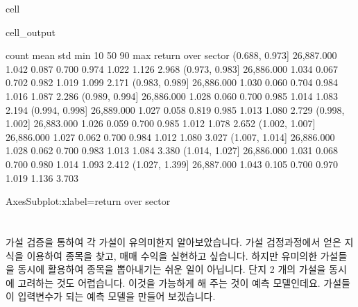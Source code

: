 \documentclass[letterpaper,10pt,english]{jupyterBook}
\begin{document}
\begin{sphinxuseclass}{cell}
\begin{sphinxVerbatimOutput}
\begin{sphinxuseclass}{cell_output}
\begin{sphinxVerbatim}[commandchars=\\\{\}]
                        count  mean   std   min   10\PYGZpc{}   50\PYGZpc{}   90\PYGZpc{}   max
return over sector                                                     
(0.688, 0.973]     26,887.000 1.042 0.087 0.700 0.974 1.022 1.126 2.968
(0.973, 0.983]     26,886.000 1.034 0.067 0.702 0.982 1.019 1.099 2.171
(0.983, 0.989]     26,886.000 1.030 0.060 0.704 0.984 1.016 1.087 2.286
(0.989, 0.994]     26,886.000 1.028 0.060 0.700 0.985 1.014 1.083 2.194
(0.994, 0.998]     26,889.000 1.027 0.058 0.819 0.985 1.013 1.080 2.729
(0.998, 1.002]     26,883.000 1.026 0.059 0.700 0.985 1.012 1.078 2.652
(1.002, 1.007]     26,886.000 1.027 0.062 0.700 0.984 1.012 1.080 3.027
(1.007, 1.014]     26,886.000 1.028 0.062 0.700 0.983 1.013 1.084 3.380
(1.014, 1.027]     26,886.000 1.031 0.068 0.700 0.980 1.014 1.093 2.412
(1.027, 1.399]     26,887.000 1.043 0.105 0.700 0.970 1.019 1.136 3.703
\end{sphinxVerbatim}

\begin{sphinxVerbatim}[commandchars=\\\{\}]
\PYGZlt{}AxesSubplot:xlabel=\PYGZsq{}return over sector\PYGZsq{}\PYGZgt{}
\end{sphinxVerbatim}

\noindent{}

\end{sphinxuseclass}\end{sphinxVerbatimOutput}

\end{sphinxuseclass}

\chapter{}
\label{\detokenize{chapter5/5.2.0_Solution_Details:id1}}\label{\detokenize{chapter5/5.2.0_Solution_Details::doc}}
\sphinxAtStartPar
가설 검증을 통하여 각 가설이 유의미한지 알아보았습니다. 가설 검정과정에서 얻은 지식을 이용하여  종목을 찾고, 매매 수익을 실현하고 싶습니다. 하지만 유미의한 가설들을 동시에 활용하여 종목을 뽑아내기는 쉬운 일이 아닙니다.  단지 2 개의 가설을 동시에 고려하는 것도 어렵습니다.  이것을 가능하게 해 주는 것이 예측 모델인데요. 가설들이 입력변수가 되는 예측 모델을 만들어 보겠습니다.
\end{document}
